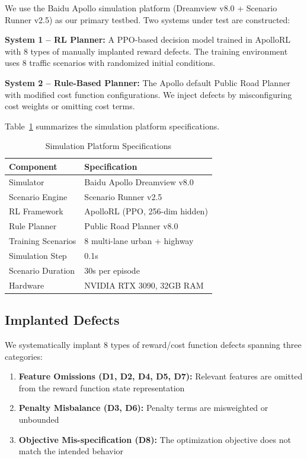\documentclass[conference]{IEEEtran}
\theoremstyle{plain}
\begin{document}
We use the Baidu Apollo simulation platform (Dreamview v8.0 + Scenario Runner v2.5) as our primary testbed. Two systems under test are constructed:

\textbf{System 1 -- RL Planner:} A PPO-based decision model trained in ApolloRL with 8 types of manually implanted reward defects. The training environment uses 8 traffic scenarios with randomized initial conditions.

\textbf{System 2 -- Rule-Based Planner:} The Apollo default Public Road Planner with modified cost function configurations. We inject defects by misconfiguring cost weights or omitting cost terms.

Table~\ref{tab:platform} summarizes the simulation platform specifications.

\begin{table}[h]
\centering
\caption{Simulation Platform Specifications}
\label{tab:platform}
\begin{tabular}{ll}
\toprule
\textbf{Component} & \textbf{Specification} \\
\midrule
Simulator & Baidu Apollo Dreamview v8.0 \\
Scenario Engine & Scenario Runner v2.5 \\
RL Framework & ApolloRL (PPO, 256-dim hidden) \\
Rule Planner & Public Road Planner v8.0 \\
Training Scenarios & 8 multi-lane urban + highway \\
Simulation Step & 0.1s \\
Scenario Duration & 30s per episode \\
Hardware & NVIDIA RTX 3090, 32GB RAM \\
\bottomrule
\end{tabular}
\end{table}

\subsection{Implanted Defects}

We systematically implant 8 types of reward/cost function defects spanning three categories:

\begin{enumerate}[nosep]
    \item \textbf{Feature Omissions (D1, D2, D4, D5, D7):} Relevant features are omitted from the reward function state representation
    \item \textbf{Penalty Misbalance (D3, D6):} Penalty terms are misweighted or unbounded
    \item \textbf{Objective Mis-specification (D8):} The optimization objective does not match the intended behavior
\end{enumerate}
\end{document}

